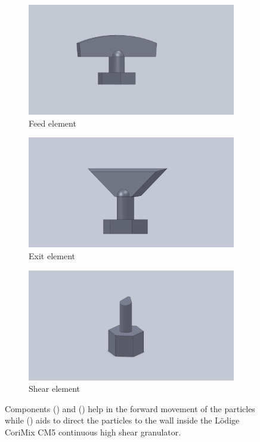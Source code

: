 \documentclass[preprint,11pt,authoryear]{elsarticle}
\begin{document}
\begin{figure}[H]
\begin{subfigure}{.3\textwidth}
\centering
\includegraphics[scale=0.075]{feed_element.pdf}	      
\caption{Feed element}
\label{fig:mthds_dem_feed_element}
\end{subfigure}%
\begin{subfigure}{.3\textwidth}
	\centering
	\includegraphics[scale=0.075]{exit_element.pdf}
	\caption{Exit element}
	\label{fig:mthds_dem_exit_element}
\end{subfigure}
\begin{subfigure}{.3\textwidth}
\centering
\includegraphics[scale=0.075]{shear_element.pdf}
\caption{Shear element}
\label{fig:mthds_dem_shear_element}
\end{subfigure}
\caption{Components () and () help in the forward 
movement of the particles while () aids to direct the particles to the wall 
inside the L\"{o}dige CoriMix CM5 continuous high shear granulator.}
\label{fig:mthds_dem_charles_fig5pt3and4_blades_n_isometric}
\end{figure}     
\end{document}
